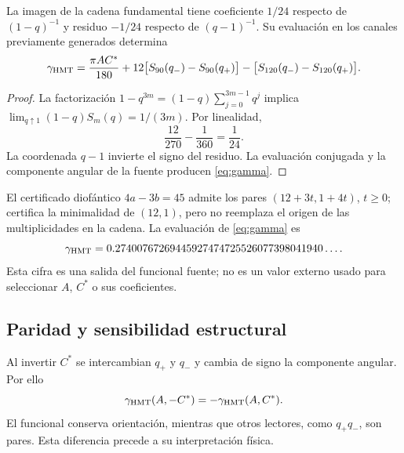 \begin{theorem}
La imagen de la cadena fundamental tiene coeficiente $1/24$
respecto de $(1-q)^{-1}$ y residuo $-1/24$ respecto de $(q-1)^{-1}$.
Su evaluación en los canales previamente generados determina
\begin{equation}
\gamma_{\HMT}=
\frac{\pi AC^*}{180}
+12\bigl[S_{90}(q_-)-S_{90}(q_+)\bigr]
-\bigl[S_{120}(q_-)-S_{120}(q_+)\bigr].
\label{eq:gamma}
\end{equation}
\end{theorem}
\begin{proof}
La factorización $1-q^{3m}=(1-q)\sum_{j=0}^{3m-1}q^j$ implica
$\lim_{q\uparrow1}(1-q)S_m(q)=1/(3m)$. Por linealidad,
\[
\frac{12}{270}-\frac1{360}=\frac1{24}.
\]
La coordenada $q-1$ invierte el signo del residuo.
La evaluación conjugada y la componente angular de la fuente
producen \eqref{eq:gamma}.
\end{proof}

El certificado diofántico $4a-3b=45$ admite los pares
$(12+3t,1+4t)$, $t\ge0$; certifica la minimalidad de $(12,1)$,
pero no reemplaza el origen de las multiplicidades en la cadena.
La evaluación de \eqref{eq:gamma} es
\[
\gamma_{\mathrm{HMT}}
=0.27400767269445927474725526077398041940\ldots.
\]
Esta cifra es una salida del funcional fuente; no es un valor externo
usado para seleccionar $A$, $C^*$ o sus coeficientes.

\subsection{Paridad y sensibilidad estructural}
Al invertir $C^*$ se intercambian $q_+$ y $q_-$ y cambia de signo
la componente angular. Por ello
\[
\gamma_{\mathrm{HMT}}(A,-C^*)=-\gamma_{\mathrm{HMT}}(A,C^*).
\]
El funcional conserva orientación, mientras que otros lectores,
como $q_+q_-$, son pares. Esta diferencia precede a su interpretación física.
